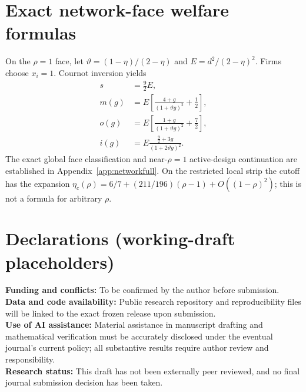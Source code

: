 \documentclass[11pt,a4paper]{article}
\theoremstyle{remark}\newtheorem{remark}[theorem]{Remark}
\begin{document}
\section{Exact network-face welfare formulas}\label{app:network}
On the $\rho=1$ face, let $\vartheta=(1-\eta)/(2-\eta)$ and $E=d^2/(2-\eta)^2$. Firms choose $x_i=1$. Cournot inversion yields
\begin{equation}\label{eq:face}
\begin{split}
s&=\tfrac92 E,\\
m(g)&=E\left[\frac{4+g}{(1+\vartheta g)^2}+\tfrac12\right],\\
o(g)&=E\left[\frac{1+g}{(1+\vartheta g)^2}+\tfrac72\right],\\
i(g)&=E\frac{\tfrac92+3g}{(1+2\vartheta g)^2}.
\end{split}
\end{equation}
The exact global face classification and near-$\rho=1$ active-design continuation are established in Appendix~\ref{app:networkfull}. On the restricted local strip the cutoff has the expansion $\eta_c(\rho)=6/7+(211/196)(\rho-1)+O((1-\rho)^2)$; this is not a formula for arbitrary $\rho$.



\section*{Declarations (working-draft placeholders)}
\noindent\textbf{Funding and conflicts:} To be confirmed by the author before submission.\\
\textbf{Data and code availability:} Public research repository and reproducibility files will be linked to the exact frozen release upon submission.\\
\textbf{Use of AI assistance:} Material assistance in manuscript drafting and mathematical verification must be accurately disclosed under the eventual journal's current policy; all substantive results require author review and responsibility.\\
\textbf{Research status:} This draft has not been externally peer reviewed, and no final journal submission decision has been taken.
\end{document}
